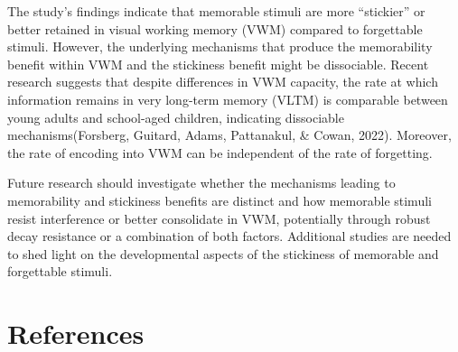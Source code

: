 \documentclass[
  man]{apa6}
\begin{document}
The study's findings indicate that memorable stimuli are more ``stickier'' or better retained in visual working memory (VWM) compared to forgettable stimuli. However, the underlying mechanisms that produce the memorability benefit within VWM and the stickiness benefit might be dissociable. Recent research suggests that despite differences in VWM capacity, the rate at which information remains in very long-term memory (VLTM) is comparable between young adults and school-aged children, indicating dissociable mechanisms(Forsberg, Guitard, Adams, Pattanakul, \& Cowan, 2022). Moreover, the rate of encoding into VWM can be independent of the rate of forgetting.

Future research should investigate whether the mechanisms leading to memorability and stickiness benefits are distinct and how memorable stimuli resist interference or better consolidate in VWM, potentially through robust decay resistance or a combination of both factors. Additional studies are needed to shed light on the developmental aspects of the stickiness of memorable and forgettable stimuli.

\newpage

\hypertarget{references}{%
\section{References}\label{references}}
\end{document}
